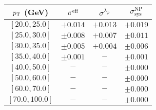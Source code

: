 \begin{tabular}{c||c|c||c}
$p_\text{T}$ (GeV) & $\sigma^{\text{eff}}$ & $\sigma^{\lambda_\varphi}$ & $\sigma_{\text{sys}}^{\text{NP}}$ \\
\hline
$[20.0, 25.0]$ & $\pm0.014$ & $+0.013$ & $\pm0.019$\\
$[25.0, 30.0]$ & $\pm0.008$ & $+0.007$ & $\pm0.011$\\
$[30.0, 35.0]$ & $\pm0.005$ & $+0.004$ & $\pm0.006$\\
$[35.0, 40.0]$ & $\pm0.001$ & $-$ & $\pm0.001$\\
$[40.0, 50.0]$ & $-$ & $-$ & $\pm0.000$\\
$[50.0, 60.0]$ & $-$ & $-$ & $\pm0.000$\\
$[60.0, 70.0]$ & $-$ & $-$ & $\pm0.000$\\
$[70.0, 100.0]$ & $-$ & $-$ & $\pm0.000$\\
\end{tabular}

